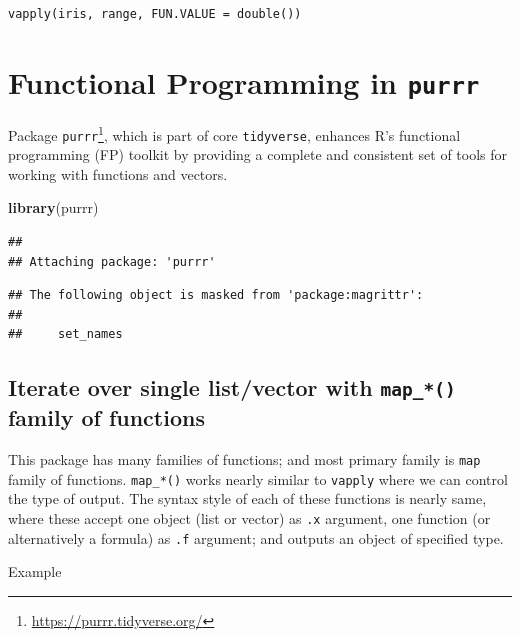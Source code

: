 \documentclass[
]{book}
\newenvironment{Shaded}{\begin{snugshade}}{\end{snugshade}}
\newcommand{\FunctionTok}[1]{\textcolor[rgb]{0.13,0.29,0.53}{\textbf{#1}}}
\newcommand{\NormalTok}[1]{#1}
\begin{document}
\begin{verbatim}
vapply(iris, range, FUN.VALUE = double())
\end{verbatim}

\hypertarget{purrr}{%
\section{\texorpdfstring{Functional Programming in \texttt{purrr}}{Functional Programming in purrr}}\label{purrr}}

Package \texttt{purrr}\footnote{\url{https://purrr.tidyverse.org/}}, which is part of core \texttt{tidyverse}, enhances R's functional programming (FP) toolkit by providing a complete and consistent set of tools for working with functions and vectors.

\begin{Shaded}
\begin{Highlighting}[]
\FunctionTok{library}\NormalTok{(purrr)}
\end{Highlighting}
\end{Shaded}

\begin{verbatim}
## 
## Attaching package: 'purrr'
\end{verbatim}

\begin{verbatim}
## The following object is masked from 'package:magrittr':
## 
##     set_names
\end{verbatim}

\hypertarget{iterate-over-single-listvector-with-map_-family-of-functions}{%
\subsection{\texorpdfstring{Iterate over single list/vector with \texttt{map\_*()} family of functions}{Iterate over single list/vector with map\_*() family of functions}}\label{iterate-over-single-listvector-with-map_-family-of-functions}}

This package has many families of functions; and most primary family is \texttt{map} family of functions. \texttt{map\_*()} works nearly similar to \texttt{vapply} where we can control the type of output. The syntax style of each of these functions is nearly same, where these accept one object (list or vector) as \texttt{.x} argument, one function (or alternatively a formula) as \texttt{.f} argument; and outputs an object of specified type.

Example
\end{document}
